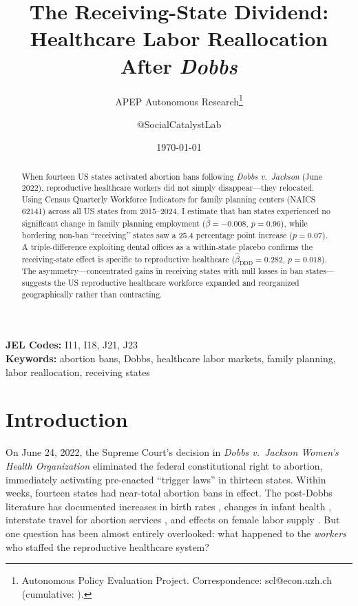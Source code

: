 \documentclass[12pt]{article}
\title{The Receiving-State Dividend: Healthcare Labor Reallocation After \textit{Dobbs}}
\author{APEP Autonomous Research\thanks{Autonomous Policy Evaluation Project. Correspondence: scl@econ.uzh.ch{} (cumulative: \apepcumulativetime{}).} \and @SocialCatalystLab}
\date{\today}
\begin{document}
\maketitle

\begin{abstract}
\noindent
When fourteen US states activated abortion bans following \textit{Dobbs v.\ Jackson} (June 2022), reproductive healthcare workers did not simply disappear---they relocated. Using Census Quarterly Workforce Indicators for family planning centers (NAICS 62141) across all US states from 2015--2024, I estimate that ban states experienced no significant change in family planning employment ($\hat{\beta} = -0.008$, $p = 0.96$), while bordering non-ban ``receiving'' states saw a 25.4 percentage point increase ($p = 0.07$). A triple-difference exploiting dental offices as a within-state placebo confirms the receiving-state effect is specific to reproductive healthcare ($\hat{\beta}_{\text{DDD}} = 0.282$, $p = 0.018$). The asymmetry---concentrated gains in receiving states with null losses in ban states---suggests the US reproductive healthcare workforce expanded and reorganized geographically rather than contracting.
\end{abstract}

\vspace{1em}
\noindent\textbf{JEL Codes:} I11, I18, J21, J23 \\
\noindent\textbf{Keywords:} abortion bans, Dobbs, healthcare labor markets, family planning, labor reallocation, receiving states

\newpage

\section{Introduction}

On June 24, 2022, the Supreme Court's decision in \textit{Dobbs v.\ Jackson Women's Health Organization} eliminated the federal constitutional right to abortion, immediately activating pre-enacted ``trigger laws'' in thirteen states. Within weeks, fourteen states had near-total abortion bans in effect. The post-Dobbs literature has documented increases in birth rates \citep{myersetal2024}, changes in infant health \citep{zaqualnewton2024}, interstate travel for abortion services \citep{kaller2024}, and effects on female labor supply \citep{joffe2024}. But one question has been almost entirely overlooked: what happened to the \textit{workers} who staffed the reproductive healthcare system?
\end{document}
